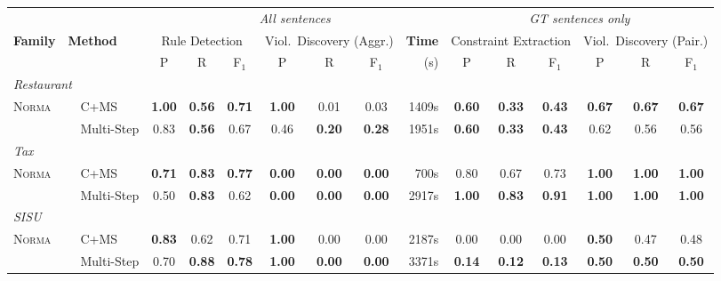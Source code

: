 \begin{table}[t]
  \centering
  \small
  \setlength{\tabcolsep}{4pt}
  \begin{tabular}{llcccccc@{\hspace{0.8em}}r@{\hspace{1.2em}}cccccc}
    \toprule
    & & \multicolumn{7}{c}{\textit{All sentences}} & \multicolumn{6}{c}{\textit{GT sentences only}} \\
    \cmidrule(lr){3-9}\cmidrule(lr){10-15}
    \textbf{Family} & \textbf{Method} & \multicolumn{3}{c}{Rule Detection} & \multicolumn{3}{c}{Viol.\ Discovery (Aggr.)} & \textbf{Time} & \multicolumn{3}{c}{Constraint Extraction} & \multicolumn{3}{c}{Viol.\ Discovery (Pair.)} \\
    \cmidrule(lr){3-5}  \cmidrule(lr){6-8}  \cmidrule(lr){10-12}  \cmidrule(lr){13-15}
    & & P & R & F$_1$ & P & R & F$_1$ & (s) & P & R & F$_1$ & P & R & F$_1$ \\
    \midrule
    \multicolumn{15}{l}{\textit{Restaurant}} \\
    \multirow{2}{*}{\textsc{Norma}} & ~~C+MS & \textbf{1.00} & \textbf{0.56} & \textbf{0.71} & \textbf{1.00} & 0.01 & 0.03 & 1409s & \textbf{0.60} & \textbf{0.33} & \textbf{0.43} & \textbf{0.67} & \textbf{0.67} & \textbf{0.67} \\
     & ~~Multi-Step & 0.83 & \textbf{0.56} & 0.67 & 0.46 & \textbf{0.20} & \textbf{0.28} & 1951s & \textbf{0.60} & \textbf{0.33} & \textbf{0.43} & 0.62 & 0.56 & 0.56 \\
    \midrule
    \multicolumn{15}{l}{\textit{Tax}} \\
    \multirow{2}{*}{\textsc{Norma}} & ~~C+MS & \textbf{0.71} & \textbf{0.83} & \textbf{0.77} & \textbf{0.00} & \textbf{0.00} & \textbf{0.00} & 700s & 0.80 & 0.67 & 0.73 & \textbf{1.00} & \textbf{1.00} & \textbf{1.00} \\
     & ~~Multi-Step & 0.50 & \textbf{0.83} & 0.62 & \textbf{0.00} & \textbf{0.00} & \textbf{0.00} & 2917s & \textbf{1.00} & \textbf{0.83} & \textbf{0.91} & \textbf{1.00} & \textbf{1.00} & \textbf{1.00} \\
    \midrule
    \multicolumn{15}{l}{\textit{SISU}} \\
    \multirow{2}{*}{\textsc{Norma}} & ~~C+MS & \textbf{0.83} & 0.62 & 0.71 & \textbf{1.00} & 0.00 & 0.00 & 2187s & 0.00 & 0.00 & 0.00 & \textbf{0.50} & 0.47 & 0.48 \\
     & ~~Multi-Step & 0.70 & \textbf{0.88} & \textbf{0.78} & \textbf{1.00} & \textbf{0.00} & \textbf{0.00} & 3371s & \textbf{0.14} & \textbf{0.12} & \textbf{0.13} & \textbf{0.50} & \textbf{0.50} & \textbf{0.50} \\

\end{tabular}
\end{table}
